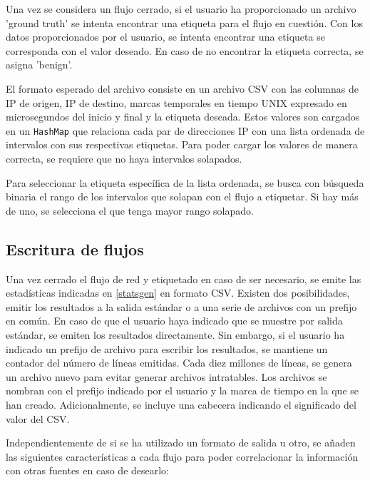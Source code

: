 Una vez se considera un flujo cerrado, si el usuario ha proporcionado un archivo 'ground truth' se intenta encontrar una etiqueta para el flujo en cuestión. Con los datos proporcionados por el usuario, se intenta encontrar una etiqueta se corresponda con el valor deseado. En caso de no encontrar la etiqueta correcta, se asigna 'benign'.

El formato esperado del archivo consiste en un archivo CSV con las columnas de IP de origen, IP de destino, marcas temporales en tiempo UNIX expresado en microsegundos del inicio y final y la etiqueta deseada. Estos valores son cargados en un \texttt{HashMap} que relaciona cada par de direcciones IP con una lista ordenada de intervalos con sus respectivas etiquetas. Para poder cargar los valores de manera correcta, se requiere que no haya intervalos solapados.

Para seleccionar la etiqueta específica de la lista ordenada, se busca con búsqueda binaria el rango de los intervalos que solapan con el flujo a etiquetar. Si hay más de uno, se selecciona el que tenga mayor rango solapado.

\subsection{Escritura de flujos} \label{flowwrite}

Una vez cerrado el flujo de red y etiquetado en caso de ser necesario, se emite las estadísticas indicadas en \ref{statsgen} en formato CSV. Existen dos posibilidades, emitir los resultados a la salida estándar o a una serie de archivos con un prefijo en común. En caso de que el usuario haya indicado que se muestre por salida estándar, se emiten los resultados directamente. Sin embargo, si el usuario ha indicado un prefijo de archivo para escribir los resultados, se mantiene un contador del número de líneas emitidas. Cada diez millones de líneas, se genera un archivo nuevo para evitar generar archivos intratables. Los archivos se nombran con el prefijo indicado por el usuario y la marca de tiempo en la que se han creado. Adicionalmente, se incluye una cabecera indicando el significado del valor del CSV.

Independientemente de si se ha utilizado un formato de salida u otro, se añaden las siguientes características a cada flujo para poder correlacionar la información con otras fuentes en caso de desearlo:

